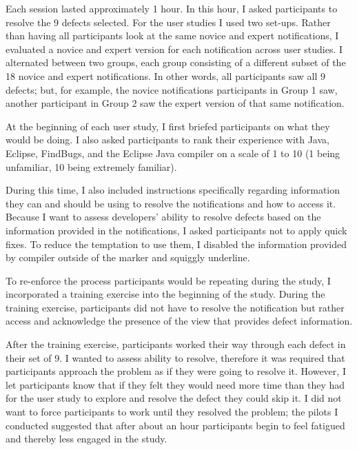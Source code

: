 Each session lasted approximately 1 hour. In this hour, I asked participants to resolve the 9 defects selected. 
For the user studies I used two set-ups.
Rather than having all participants look at the same novice and expert notifications, I evaluated a novice and expert version for each notification across user studies. I alternated between two groups, each group consisting of a different subset of the 18 novice and expert notifications. In other words, all participants saw all 9 defects; but, for example, the novice notifications participants in Group 1 saw, another participant in Group 2 saw the expert version of that same notification.

At the beginning of each user study, I first briefed participants on what they would be doing. 
I also asked participants to rank their experience with Java, Eclipse, FindBugs, and the Eclipse Java compiler on a scale of 1 to 10 (1 being unfamiliar, 10 being extremely familiar). 

During this time, I also included instructions specifically regarding information they can and should be using to resolve the notifications and how to access it. Because I want to assess developers' ability to resolve defects based on the information provided in the notifications, I asked participants not to apply quick fixes. To reduce the temptation to use them, I disabled the information provided by compiler outside of the marker and squiggly underline. 

To re-enforce the process participants would be repeating during the study, I incorporated a training exercise into the beginning of the study. During the training exercise, participants did not have to resolve the notification but rather access and acknowledge the presence of the view that provides defect information.

After the training exercise, participants worked their way through each defect in their set of 9. I wanted to assess ability to resolve, therefore it was required that participants approach the problem as if they were going to resolve it. However, I let participants know that if they felt they would need more time than they had for the user study to explore and resolve the defect they could skip it. I did not want to force participants to work until they resolved the problem; the pilots I conducted suggested that after about an hour participants begin to feel fatigued and thereby less engaged in the study.

